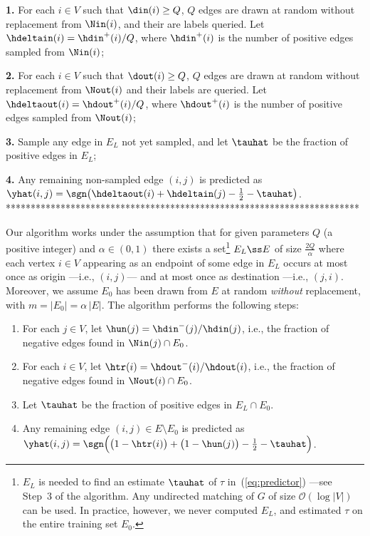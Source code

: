 \textbf{1.} For each $i \in V$ such that $\din(i) \ge Q$, $Q$ edges are drawn at random without replacement from $\Nin(i)$, and their are labels queried. Let
$
	\hdeltain(i) = \hdin^+(i)/Q
$,
where $\hdin^+(i)$ is the number of positive edges sampled from $\Nin(i)$;

\textbf{2.} For each $i \in V$ such that $\dout(i) \ge Q$, $Q$ edges are drawn at random without replacement from $\Nout(i)$ and their labels are queried. Let
$
	\hdeltaout(i) = \hdout^+(i)/Q
$,
where $\hdout^+(i)$ is the number of positive edges sampled from $\Nout(i)$;

\textbf{3.} Sample any edge in $E_L$ not yet sampled, and let $\tauhat$ be the fraction of positive edges in $E_L$;

\textbf{4.} Any remaining non-sampled edge $(i,j)$ is predicted as
$
	\yhat(i,j) = \sgn\big(\hdeltaout(i) + \hdeltain(j) - \tfrac{1}{2} - \tauhat \big)
$.
***********************************************************************
\fi


Our algorithm works under the assumption that for given parameters $Q$ (a positive integer) and $\alpha \in (0,1)$ there exists a set\footnote
{
$E_L$ is needed to find an estimate $\tauhat$ of $\tau$ in~(\ref{eq:predictor}) ---see Step~3 of the algorithm. Any undirected matching of $G$ of size $\mathcal{O}(\log|V|)$ can be used. In practice, however, we never computed $E_L$, and estimated $\tau$ on the entire training set $E_0$.
}
$E_L \ss E$ of size $\tfrac{2Q}{\alpha}$ where each vertex $i \in V$ appearing as an endpoint of some edge in $E_L$ occurs at most once as origin ---i.e., $(i,j)$--- and at most once as destination ---i.e., $(j,i)$. Moreover, we assume $E_0$ has been drawn from $E$ at random {\em without} replacement, with $m = |E_0| = \alpha\,|E|$. The algorithm performs the following steps:


\begin{enumerate}[leftmargin=*,nosep,label=\textbf{\arabic*.}]
	\item For each $j \in V$, let
		$
		\hun(j) = \hdin^-(j)/\hdin(j)
		$,
		i.e., the fraction of negative edges found in $\Nin(j) \cap E_0$.

	\item For each $i \in V$, let
		$
		\htr(i) = \hdout^-(i)/\hdout(i)
		$,
		i.e., the fraction of negative edges found in $\Nout(i) \cap E_0$.

	\item Let $\tauhat$ be the fraction of positive edges in $E_L\cap E_0$.

	\item Any remaining edge $(i,j) \in E\setminus E_0$ is predicted as
		$
		\yhat(i,j) = \sgn\Big(\big(1-\htr(i)\big) + \big(1-\hun(j)\big) - \tfrac{1}{2} -\tauhat\Big)
		$.
\end{enumerate}

